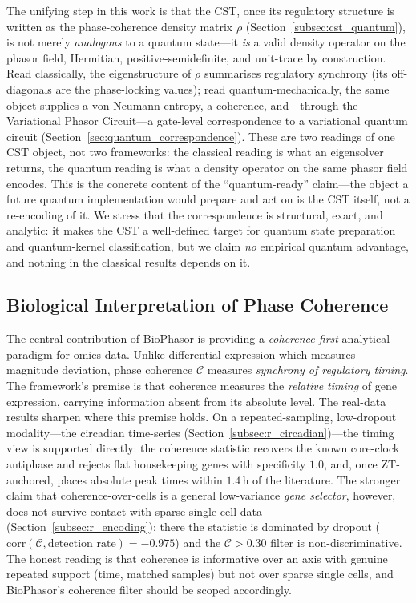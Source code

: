 \documentclass[preprint,12pt,amsmath,amssymb,superscriptaddress,floatfix]{revtex4-2}
\begin{document}
The unifying step in this work is that the CST, once its regulatory structure is
written as the phase-coherence density matrix $\rho$
(Section~\ref{subsec:cst_quantum}), is not merely \emph{analogous} to a quantum
state---it \emph{is} a valid density operator on the phasor field, Hermitian,
positive-semidefinite, and unit-trace by construction. Read classically, the
eigenstructure of $\rho$ summarises regulatory synchrony (its off-diagonals are
the phase-locking values); read quantum-mechanically, the same object supplies a
von Neumann entropy, a coherence, and---through the Variational Phasor
Circuit---a gate-level correspondence to a variational quantum circuit
(Section~\ref{sec:quantum_correspondence}). These are two readings of one CST
object, not two frameworks: the classical reading is what an eigensolver returns,
the quantum reading is what a density operator on the same phasor field encodes.
This is the concrete content of the ``quantum-ready'' claim---the object a future
quantum implementation would prepare and act on is the CST itself, not a
re-encoding of it. We stress that the correspondence is structural, exact, and
analytic: it makes the CST a well-defined target for quantum state preparation
and quantum-kernel classification, but we claim \emph{no} empirical quantum
advantage, and nothing in the classical results depends on it.

\subsection{Biological Interpretation of Phase Coherence}

The central contribution of BioPhasor is providing a \emph{coherence-first}
analytical paradigm for omics data.
Unlike differential expression which measures magnitude deviation,
phase coherence $\mathcal{C}$ measures \emph{synchrony of regulatory timing}.
The framework's premise is that coherence measures the \emph{relative timing}
of gene expression, carrying information absent from its absolute level. The
real-data results sharpen where this premise holds. On a repeated-sampling,
low-dropout modality---the circadian time-series
(Section~\ref{subsec:r_circadian})---the timing view is supported directly:
the coherence statistic recovers the known core-clock antiphase and rejects
flat housekeeping genes with specificity $1.0$, and, once ZT-anchored, places
absolute peak times within $1.4$\,h of the literature. The stronger claim that
coherence-over-cells is a general low-variance \emph{gene selector}, however,
does not survive contact with sparse single-cell data
(Section~\ref{subsec:r_encoding}): there the statistic is dominated by dropout
($\mathrm{corr}(\mathcal{C},\text{detection rate}) = -0.975$) and the
$\mathcal{C}>0.30$ filter is non-discriminative. The honest reading is that
coherence is informative over an axis with genuine repeated support (time,
matched samples) but not over sparse single cells, and BioPhasor's coherence
filter should be scoped accordingly.
\end{document}
